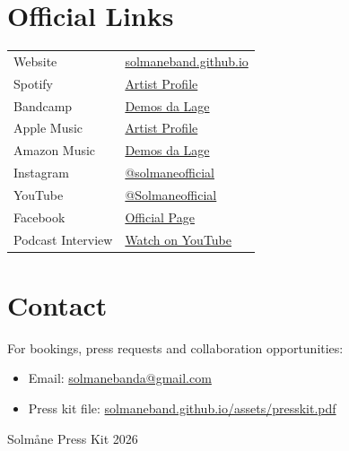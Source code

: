 \documentclass[11pt,a4paper]{article}
\begin{document}
\section*{Official Links}
\begin{tabularx}{\textwidth}{>{\raggedright\arraybackslash}p{} X}
Website & \href{https://solmaneband.github.io/}{solmaneband.github.io} \\
Spotify & \href{https://open.spotify.com/artist/0XYxjDhjXN9VEgTs7Z59iq}{Artist Profile} \\
Bandcamp & \href{https://solmane.bandcamp.com/album/demos-da-lage}{Demos da Lage} \\
Apple Music & \href{https://music.apple.com/lu/artist/solmane/1673074844}{Artist Profile} \\
Amazon Music & \href{https://music.amazon.com/albums/B0FJY9FCXG}{Demos da Lage} \\
Instagram & \href{https://www.instagram.com/solmaneofficial/}{@solmaneofficial} \\
YouTube & \href{https://www.youtube.com/@Solmaneofficial}{@Solmaneofficial} \\
Facebook & \href{https://www.facebook.com/profile.php?id=61585087408800}{Official Page} \\
Podcast Interview & \href{https://www.youtube.com/watch?v=gz7kYAouGes}{Watch on YouTube} \\
\end{tabularx}

\section*{Contact}
For bookings, press requests and collaboration opportunities:
\begin{itemize}[leftmargin=1.2em]
  \item Email: \href{mailto:solmanebanda@gmail.com}{solmanebanda@gmail.com}
  \item Press kit file: \href{https://solmaneband.github.io/assets/presskit.pdf}{solmaneband.github.io/assets/presskit.pdf}
\end{itemize}

\vfill
\begin{center}
  {\small Solm\aa ne \textbar{} Press Kit \textbar{} 2026}
\end{center}
\end{document}
